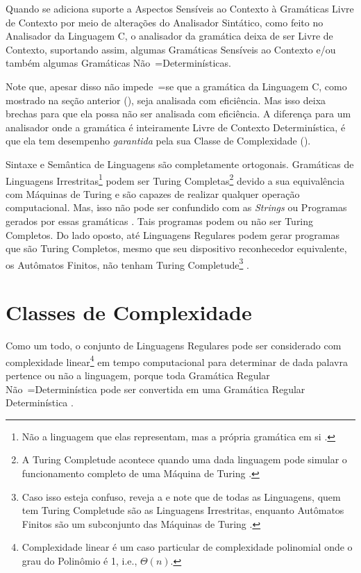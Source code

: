 Quando se adiciona suporte a Aspectos Sensíveis ao Contexto \cite{contextSensitiveParsing} à Gramáticas Livre de Contexto por meio de alterações do Analisador Sintático,
como feito no Analisador da Linguagem C,
o analisador da gramática deixa de ser Livre de Contexto,
suportando assim,
algumas Gramáticas Sensíveis ao Contexto e\slash{}ou também algumas Gramáticas Não~=Determinísticas.

Note que,
apesar disso não impede~=se que a gramática da Linguagem C,
como mostrado na seção anterior (),
seja analisada com eficiência.
Mas isso deixa brechas para que ela possa não ser analisada com eficiência.
A diferença para um analisador onde a gramática é inteiramente Livre de Contexto Determinística,
é que ela tem desempenho \textit{garantida} pela sua Classe de Complexidade ().

Sintaxe e
Semântica de Linguagens são completamente ortogonais.
Gramáticas de Linguagens Irrestritas\footnote{
Não a linguagem que elas representam,
mas a própria gramática em si \cite{finiteAutomataTuringComplete}.
}
podem ser Turing Completas\footnote{
A Turing Completude acontece quando uma dada linguagem pode simular o funcionamento completo de uma Máquina de Turing \cite{areThereDomainSpecificLanguages}.
}
devido a sua equivalência com Máquinas de Turing e
são capazes de realizar qualquer operação computacional.
Mas,
isso não pode ser confundido com as \textit{Strings} ou
Programas gerados por essas gramáticas \cite{areThereDomainSpecificLanguages,yamlSpecificModelChecking}.
Tais programas podem ou
não ser Turing Completos.
Do lado oposto,
até Linguagens Regulares podem gerar programas que são Turing Completos,
mesmo que seu dispositivo reconhecedor equivalente,
os Autômatos Finitos,
não tenham Turing Completude\footnote{
Caso isso esteja confuso,
reveja a  e
note que de todas as Linguagens,
quem tem Turing Completude são as Linguagens Irrestritas,
enquanto Autômatos Finitos são um subconjunto das Máquinas de Turing \cite{finiteAutomataTuringComplete}.
}
\cite{turingCompleteRegularLanguages,finiteAutomataTuringComplete}.


\section{Classes de Complexidade}
\label{section:classesDeComplexidade}

Como um todo,
o conjunto de Linguagens Regulares pode ser considerado com complexidade linear\footnote{
Complexidade linear é um caso particular de complexidade polinomial onde o grau do Polinômio é 1,
i.e.,
$\Theta(n)$.
}
em tempo computacional para determinar de dada palavra pertence ou
não a linguagem,
porque toda Gramática Regular Não~=Determinística pode ser convertida em uma Gramática Regular Determinística \cite{sipserBook}.

